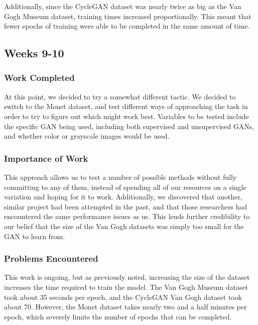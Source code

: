\documentclass[12pt,letterpaper]{article}
\begin{document}
	Additionally, since the CycleGAN dataset was nearly twice as big as the Van Gogh Museum dataset, training times increased proportionally.
	This meant that fewer epochs of training were able to be completed in the same amount of time.

	\subsection{Weeks 9-10}
	\subsubsection{Work Completed}
	At this point, we decided to try a somewhat different tactic.
	We decided to switch to the Monet dataset, and test different ways of approaching the task in order to try to figure out which might work best.
	Variables to be tested include the specific GAN being used, including both supervised and unsupervised GANs, and whether color or grayscale images would be used.
	\subsubsection{Importance of Work}
	This approach allows us to test a number of possible methods without fully committing to any of them, instead of spending all of our resources on a single variation and hoping for it to work.
	Additionally, we discovered that another, similar project had been attempted in the past\cite{otherGanGogh}, and that those researchers had encountered the same performance issues as us.
	This lends further credibility to our belief that the size of the Van Gogh datasets was simply too small for the GAN to learn from.
	\subsubsection{Problems Encountered}
	This work is ongoing, but as previously noted, increasing the size of the dataset increases the time required to train the model.
	The Van Gogh Museum dataset took about 35 seconds per epoch, and the CycleGAN Van Gogh dataset took about 70.
	However, the Monet dataset takes nearly two and a half minutes per epoch, which severely limits the number of epochs that can be completed.


\nocite{*}
\end{document}
